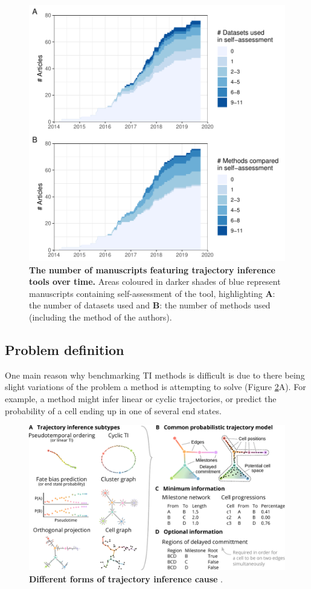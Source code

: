 \begin{figure}[htb!]
	\centering
	\includegraphics[width=.75\linewidth]{fig/self_assessment.pdf} 
	\caption{\textbf{The number of manuscripts featuring trajectory inference tools over time.} Areas coloured in darker shades of blue represent manuscripts containing self-assessment of the tool, highlighting \textbf{A}: the number of datasets used and \textbf{B}: the number of methods used (including the method of the authors).}
	\label{fig:benchmarks_over_time}
\end{figure}

\subsection{Problem definition}
One main reason why benchmarking TI methods is difficult is due to there being slight variations 
of the problem a method is attempting to solve (Figure \ref{fig:method_types}A). For example, a method might infer linear or cyclic trajectories, or predict the probability of a cell ending up in one of several end states.

\begin{figure}[htb!]
	\centering
	\includegraphics[width=.8\linewidth]{fig/method_types.pdf} 
	\caption{\textbf{Different forms of trajectory inference cause }.}
	\label{fig:method_types}
\end{figure}

